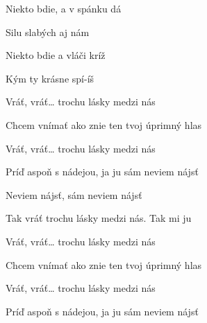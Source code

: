 \begin{song}
\bigskip

Niekto bdie, a v spánku dá \par
{} Silu slabých aj nám \par
{} Niekto bdie a vláči kríž \par
{} Kým ty krásne spí-íš \par

\bigskip

Vráť, vráť… trochu lásky medzi nás  \par
{} Chcem vnímať ako znie ten tvoj úprimný hlas  \par
{}Vráť, vráť… trochu lásky medzi nás  \par
{} Príď aspoň s nádejou, ja ju sám neviem nájsť  \par

\bigskip

Neviem nájsť, sám neviem nájsť   \par
Tak vráť trochu lásky medzi nás.  Tak mi ju \par

\bigskip


Vráť, vráť… trochu lásky medzi nás  \par
{} Chcem vnímať ako znie ten tvoj úprimný hlas  \par
{}Vráť, vráť… trochu lásky medzi nás  \par
{} Príď aspoň s nádejou, ja ju sám neviem nájsť  \par
{} \par

\end{song}
